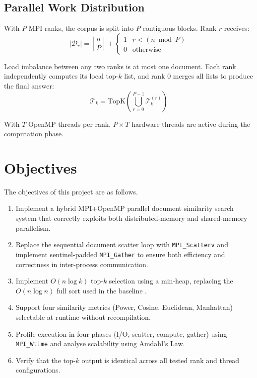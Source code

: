 \documentclass[12pt,a4paper]{article}
\begin{document}
\subsection{Parallel Work Distribution}

With $P$ MPI ranks, the corpus is split into $P$ contiguous blocks.
Rank $r$ receives:
\begin{equation}
    |\mathcal{D}_r|
    = \left\lfloor\frac{n}{P}\right\rfloor
    + \begin{cases}1 & r < (n \bmod P)\\0 & \text{otherwise}\end{cases}
\end{equation}

Load imbalance between any two ranks is at most one document. Each rank
independently computes its local top-$k$ list, and rank 0 merges all
lists to produce the final answer:
\begin{equation}
    \mathcal{T}_k
    = \mathrm{TopK}\!\left(\bigcup_{r=0}^{P-1}\mathcal{T}_k^{(r)}\right)
\end{equation}

With $T$ OpenMP threads per rank, $P \times T$ hardware threads are
active during the computation phase.

\clearpage
\section{Objectives}

The objectives of this project are as follows.

\begin{enumerate}
\item Implement a hybrid MPI+OpenMP parallel document similarity search
      system that correctly exploits both distributed-memory and
      shared-memory parallelism.

\item Replace the sequential document scatter loop with
      \texttt{MPI\_Scatterv} and implement sentinel-padded
      \texttt{MPI\_Gather} to ensure both efficiency and correctness
      in inter-process communication.

\item Implement $O(n\log k)$ top-$k$ selection using a min-heap,
      replacing the $O(n\log n)$ full sort used in the baseline
      \cite{cormen2022algorithms}.

\item Support four similarity metrics (Power, Cosine, Euclidean,
      Manhattan) selectable at runtime without recompilation.

\item Profile execution in four phases (I/O, scatter, compute, gather)
      using \texttt{MPI\_Wtime} and analyse scalability using
      Amdahl's Law.

\item Verify that the top-$k$ output is identical across all tested
      rank and thread configurations.
\end{enumerate}
\end{document}
